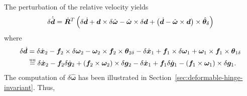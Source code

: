 \documentclass[10pt,dvips,fleqn,subeqn]{report}
\newcommand{\T}[1]{\bm{#1}}
\newcommand{\TT}[1]{\bm{#1}}
\newcommand{\equu}{\overset{\text{uu}}{=}}
\begin{document}
The perturbation of the relative velocity yields
\begin{equation}
	\delta\dot{\tilde{\T{d}}} = \hat{\TT{R}}^T \plbr{
		\delta\dot{\T{d}}
		+ \T{d} \times \delta\hat{\T{\omega}}
		- \hat{\T{\omega}} \times \delta\T{d}
		+ \plbr{\dot{\T{d}} - \hat{\T{\omega}} \times \T{d}} \times \hat{\T{\theta}}_{\delta}
	}
\end{equation}
where
\begin{align}
	\delta\dot{\T{d}}
	&=
	\delta\dot{\T{x}}_2
	- \T{f}_2 \times \delta\T{\omega}_{2}
	- \T{\omega}_{2} \times \T{f}_2 \times \T{\theta}_{2\delta}
	- \delta\dot{\T{x}}_1
	+ \T{f}_1 \times \delta\T{\omega}_{1}
	+ \T{\omega}_{1} \times \T{f}_1 \times \T{\theta}_{1\delta}
	\nonumber \\
	&\equu
	\delta\dot{\T{x}}_2
	- \T{f}_2 \delta\dot{\T{g}}_2
	+ \plbr{\T{f}_2\times\T{\omega}_2}\times\delta\T{g}_2
	- \delta\dot{\T{x}}_1
	+ \T{f}_1 \delta\dot{\T{g}}_1
	- \plbr{\T{f}_1\times\T{\omega}_1}\times\delta\T{g}_1
	.
\end{align}
The computation of $\delta\hat{\T{\omega}}$ has been illustrated
in Section~\ref{sec:deformable-hinge-invariant}.
Thus,
\end{document}
